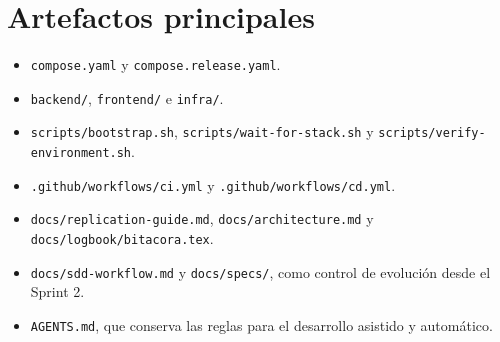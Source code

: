 \documentclass[11pt,letterpaper]{article}
\newcommand{\file}[1]{\texttt{#1}}
\begin{document}
\section{Artefactos principales}

\begin{itemize}
  \item \file{compose.yaml} y \file{compose.release.yaml}.
  \item \file{backend/}, \file{frontend/} e \file{infra/}.
  \item \file{scripts/bootstrap.sh}, \file{scripts/wait-for-stack.sh} y \file{scripts/verify-environment.sh}.
  \item \file{.github/workflows/ci.yml} y \file{.github/workflows/cd.yml}.
  \item \file{docs/replication-guide.md}, \file{docs/architecture.md} y \file{docs/logbook/bitacora.tex}.
  \item \file{docs/sdd-workflow.md} y \file{docs/specs/}, como control de evolución desde el Sprint 2.
  \item \file{AGENTS.md}, que conserva las reglas para el desarrollo asistido y automático.
\end{itemize}
\end{document}
